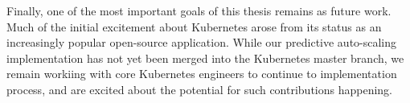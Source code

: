 Finally, one of the most important goals of this thesis remains as future work.
Much of the initial excitement about Kubernetes arose from its status as an
increasingly popular open-source application. While our predictive auto-scaling
implementation has not yet been merged into the Kubernetes master branch, we
remain workiing with core Kubernetes engineers to continue to implementation
process, and are excited about the potential for such contributions happening.
